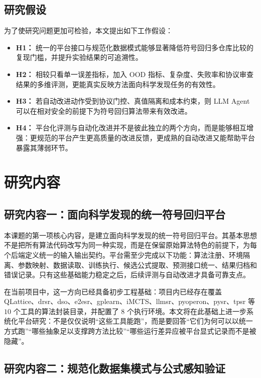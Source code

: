 \documentclass[UTF8,12pt]{ctexart}
\begin{document}
\subsection{研究假设}

为了使研究问题更加可检验，本文提出如下工作假设：
\begin{itemize}
    \item \textbf{H1：} 统一的平台接口与规范化数据模式能够显著降低符号回归多仓库比较的复现门槛，并提升实验结果的可追溯性。
    \item \textbf{H2：} 相较只看单一误差指标，加入 OOD 指标、复杂度、失败率和协议审查结果的多维评测，更能真实反映方法面向科学发现任务的有效性。
    \item \textbf{H3：} 若自动改进动作受到协议门控、真值隔离和成本约束，则 LLM Agent 可以在相对安全的前提下为符号回归算法带来有效改进。
    \item \textbf{H4：} 平台化评测与自动化改进并不是彼此独立的两个方向，而是能够相互增强：更规范的平台产生更高质量的改进反馈，更成熟的自动改进又能帮助平台暴露其薄弱环节。
\end{itemize}

\section{研究内容}

\subsection{研究内容一：面向科学发现的统一符号回归平台}

本课题的第一项核心内容，是建立面向科学发现的统一符号回归平台。其基本思想不是把所有算法代码改写为同一种实现，而是在保留原始算法特色的前提下，为每个后端定义统一的输入输出契约。平台需至少完成以下功能：算法注册、环境隔离、参数映射、数据读取、训练执行、候选公式提取、预测接口统一、结果归档和错误记录。只有这些基础能力稳定之后，后续评测与自动改进才具备可靠支点。

在当前项目中，这一方向已经具备初步工程基础：项目内已经存在覆盖 QLattice、drsr、dso、e2esr、gplearn、iMCTS、llmsr、pyoperon、pysr、tpsr 等 $10$ 个工具的算法封装目录，并配置了 $8$ 个执行环境。本文将在此基础上进一步系统化平台研究：不是仅仅说明“这些工具能跑”，而是要回答“它们为何可以以统一方式跑”“哪些抽象足以支撑跨方法比较”“哪些运行差异应被平台显式记录而不是被隐藏”。

\subsection{研究内容二：规范化数据集模式与公式感知验证}
\end{document}
